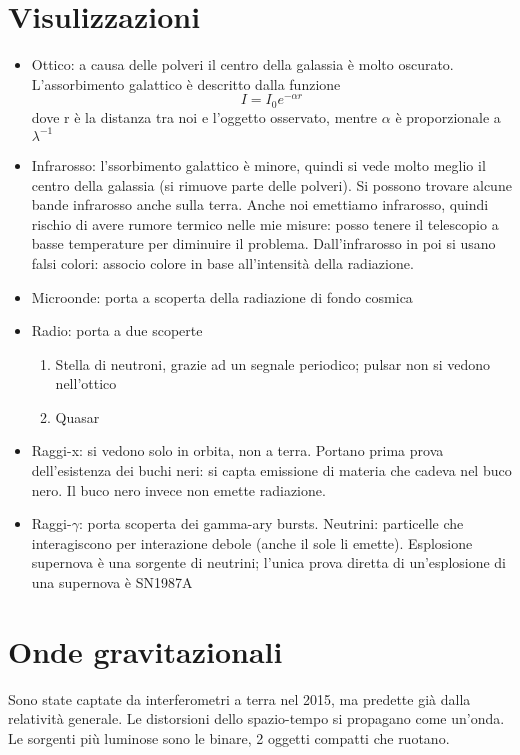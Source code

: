 \section*{Visulizzazioni}
\begin{itemize}
    \item Ottico: a causa delle polveri il centro della galassia è molto oscurato. L'assorbimento galattico è descritto dalla funzione
    \begin{equation*}
        I= I_0 e^{-\alpha r}
    \end{equation*}
    dove r è la distanza tra noi e l'oggetto osservato, mentre $\alpha$ è proporzionale a $\lambda^{-1}$
    \item Infrarosso: l'ssorbimento galattico è minore, quindi si vede molto meglio il centro della galassia (si rimuove parte delle polveri). Si possono trovare alcune bande infrarosso anche sulla terra. Anche noi emettiamo infrarosso, quindi rischio di avere rumore termico nelle mie misure: posso tenere il telescopio a basse temperature per diminuire il problema. \newline
    Dall'infrarosso in poi si usano falsi colori: associo colore in base all'intensità della radiazione.
    \item Microonde: porta a scoperta della radiazione di fondo cosmica
    \item Radio: porta a due scoperte
    \begin{enumerate}
        \item Stella di neutroni, grazie ad un segnale periodico; pulsar non si vedono nell'ottico
        \item Quasar
    \end{enumerate}
    \item Raggi-x: si vedono solo in orbita, non a terra. Portano prima prova dell'esistenza dei buchi neri: si capta emissione di materia che cadeva nel buco nero. Il buco nero invece non emette radiazione.
    \item Raggi-$\gamma$: porta scoperta dei gamma-ary bursts. \newline
    Neutrini: particelle che interagiscono per interazione debole (anche il sole li emette). Esplosione supernova è una sorgente di neutrini; l'unica prova diretta di un'esplosione di una supernova è SN1987A
\end{itemize}

\section*{Onde gravitazionali}
Sono state captate da interferometri a terra nel 2015, ma predette già dalla relatività generale. Le distorsioni dello spazio-tempo si propagano come un'onda. \newline
Le sorgenti più luminose sono le binare, 2 oggetti compatti che ruotano.


